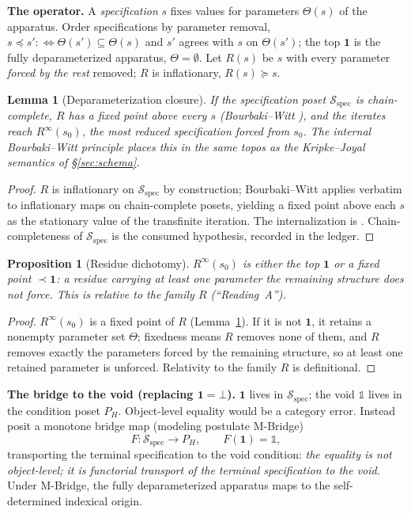 \documentclass[11pt]{article}
\newtheorem{proposition}{Proposition}
\newtheorem{lemma}{Lemma}
\theoremstyle{definition}
\theoremstyle{remark}
\newcommand{\Sspec}{\mathcal{S}_{\mathrm{spec}}}
\begin{document}
\medskip\noindent\textbf{The operator.} A \emph{specification} $s$ fixes values for parameters
$\Theta(s)$ of the apparatus. Order specifications by parameter removal,
$s \preceq s' :\Longleftrightarrow \Theta(s')\subseteq\Theta(s)$ and $s'$ agrees with $s$ on
$\Theta(s')$; the top $\mathbf{1}$ is the fully deparameterized apparatus, $\Theta=\emptyset$. Let
$R(s)$ be $s$ with every parameter \emph{forced by the rest} removed; $R$ is inflationary,
$R(s)\succeq s$.

\begin{lemma}[Deparameterization closure]\label{lem:bw}
If the specification poset $\Sspec$ is chain-complete, $R$ has a fixed point above every $s$
(Bourbaki--Witt \cite{bourbaki-witt}), and the iterates reach $R^\infty(s_0)$, the most reduced
specification forced from $s_0$. The internal Bourbaki--Witt principle \cite{bw-topos} places this in
the same topos as the Kripke--Joyal semantics of \S\ref{sec:schema}.
\end{lemma}

\begin{proof}
$R$ is inflationary on $\Sspec$ by construction; Bourbaki--Witt applies verbatim to inflationary
maps on chain-complete posets, yielding a fixed point above each $s$ as the stationary value of the
transfinite iteration. The internalization is \cite{bw-topos}. Chain-completeness of $\Sspec$ is the
consumed hypothesis, recorded in the ledger.
\end{proof}

\begin{proposition}[Residue dichotomy]\label{prop:dich}
$R^\infty(s_0)$ is either the top $\mathbf{1}$ or a fixed point $\prec\mathbf{1}$: a \emph{residue}
carrying at least one parameter the remaining structure does not force. This is relative to the family
$R$ (``Reading~A'').
\end{proposition}

\begin{proof}
$R^\infty(s_0)$ is a fixed point of $R$ (Lemma~\ref{lem:bw}). If it is not $\mathbf{1}$, it retains
a nonempty parameter set $\Theta$; fixedness means $R$ removes none of them, and $R$ removes exactly
the parameters forced by the remaining structure, so at least one retained parameter is unforced.
Relativity to the family $R$ is definitional.
\end{proof}

\medskip\noindent\textbf{The bridge to the void (replacing $\mathbf{1}=\bot$).} $\mathbf{1}$ lives in
$\Sspec$; the void $\mathbb{1}$ lives in the condition poset $P_H$. Object-level equality would be a
category error. Instead posit a monotone bridge map (modeling postulate M-Bridge)
\[
  F:\Sspec\to P_H,\qquad F(\mathbf{1})=\mathbb{1},
\]
transporting the terminal specification to the void condition: \emph{the equality is not object-level;
it is functorial transport of the terminal specification to the void.} Under M-Bridge, the fully
deparameterized apparatus maps to the self-determined indexical origin.
\end{document}
